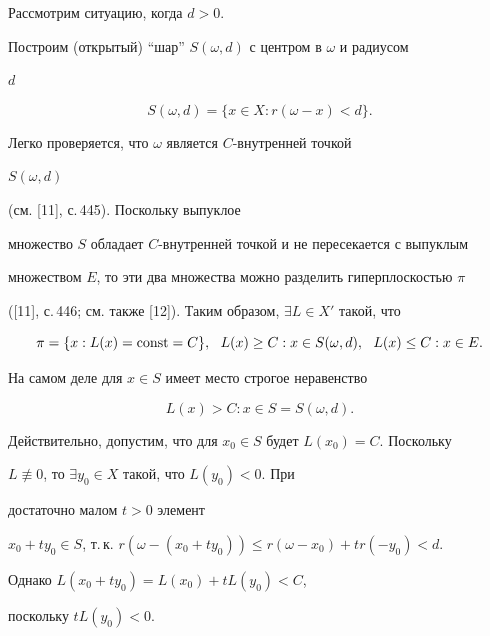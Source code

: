  


\begin{pf} 


Рассмотрим ситуацию, когда $d>0$. 


Построим (открытый) ``шар'' $S(\omega,d)$ с центром в $\omega$ и радиусом


$d$ 


\begin{equation} 


S(\omega,d)=\{x\in X:r(\omega-x)<d\}. 


\end{equation} 


Легко проверяется, что $\omega$ является $C$-внутренней точкой 


$S(\omega,d)$ 


(см. [11], с.\,445). Поскольку выпуклое 


множество $S$ обладает $C$-внутренней точкой и не пересекается с выпуклым 


множеством $E$, то эти два множества можно разделить гиперплоскостью $\pi$ 


([11], с.\,446; см. также [12]). Таким образом, $\exists L\in X'$ такой, что 


\begin{equation} 


\pi=\{x:L(x)=\const=C\},\ \ L(x)\ge C:x\in S(\omega,d), 


\ \ L(x)\le C:x\in E. 


\end{equation} 


На самом деле для $x\in S$ имеет место строгое неравенство 


\begin{equation} 


L(x)>C:x\in S=S(\omega,d). 


\end{equation} 


Действительно, допустим, что для $x_0\in S$ будет $L(x_0)=C$. Поскольку 


$L\not\equiv0$, то $\exists y_0\in X$ такой, что $L(y_0)<0$. При 


достаточно малом $t>0$ элемент 


$x_0+t y_0\in S$, т.\,к. $r(\omega-(x_0+t y_0))\le r(\omega-x_0)+t 


r(-y_0)<d$. 


Однако $L(x_0+t y_0)=L(x_0)+t L(y_0)<C$, 


поскольку $t L(y_0)<0$. 



\end{pf}
